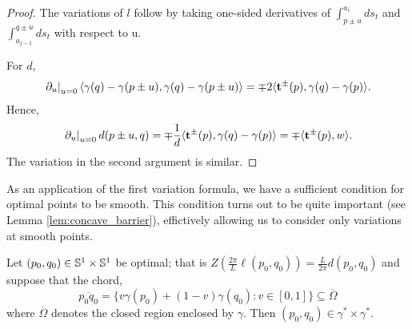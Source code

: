 \documentclass[11pt]{amsart}
\begin{document}
\begin{proof}
The variations of \(l\) follow by taking one-sided derivatives of \(\int_{p\pm u}^{a_i} ds_t\) and \(\int_{a_{j-1}}^{q \pm u} ds_t\) with respect to u.

For \(d\),
\[
\left.\partial_u\right|_{u=0} \langle{\gamma(q) - \gamma(p \pm u)},{\gamma(q) - \gamma(p \pm u)}\rangle = \mp 2 \langle{\operatorname{\mathbf{t}}^{\pm}(p)},{\gamma(q) - \gamma(p)}\rangle.
\]
Hence,
\[
\left.\partial_u\right|_{u=0} d (p \pm u, q) =  \mp \frac{1}{d} \langle{\operatorname{\mathbf{t}}^{\pm}(p)},{\gamma(q) - \gamma(p)}\rangle = \mp \langle{\operatorname{\mathbf{t}}^{\pm}(p)},{w}\rangle.
\]
The variation in the second argument is similar.
\end{proof}

As an application of the first variation formula, we have a sufficient condition for optimal points to be smooth. This condition turns out to be quite important (see Lemma \ref{lem:concave_barrier}), effictively allowing us to consider only variations at smooth points.

\begin{lemma}
\label{lem:optimum_are_regular}

Let \((p_0,q_0) \in \mathbb{S}^1 \times \mathbb{S}^1\) be optimal; that is \(Z(\tfrac{2\pi}{L}\ell(p_0,q_0)) = \tfrac{L}{2\pi} d(p_0, q_0)\) and suppose that the chord,
\[
\overline{p_0 q_0} = \{v \gamma(p_0) + (1-v) \gamma(q_0) : v \in [0, 1]\} \subseteq \overline{\Omega}
\]
where \(\overline{\Omega}\) denotes the closed region enclosed by \(\gamma\). Then \((p_0, q_0) \in \gamma^{\ast} \times \gamma^{\ast}\).
\end{lemma}
\end{document}
